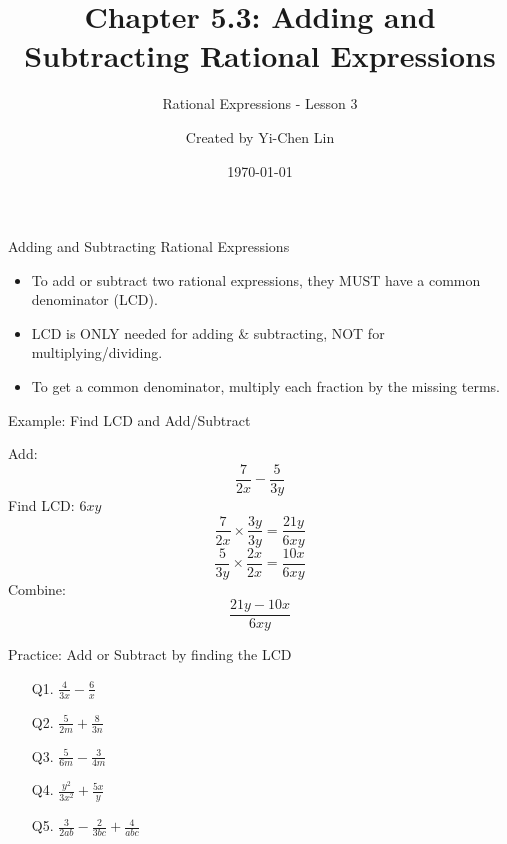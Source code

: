 \documentclass[aspectratio=169]{beamer}
\title{Chapter 5.3: Adding and Subtracting Rational Expressions}
\subtitle{Rational Expressions - Lesson 3}
\author{Created by Yi-Chen Lin}
\date{\today}
\begin{document}
\begin{frame}
\titlepage
\end{frame}

\begin{frame}{Adding and Subtracting Rational Expressions}
\begin{tcolorbox}[colback=lightgray,colframe=primary,title=Key Concepts]
\footnotesize
\begin{itemize}
  \item To add or subtract two rational expressions, they MUST have a common denominator (LCD).
  \item LCD is ONLY needed for adding & subtracting, NOT for multiplying/dividing.
  \item To get a common denominator, multiply each fraction by the missing terms.
\end{itemize}
\end{tcolorbox}
\end{frame}

\begin{frame}{Example: Find LCD and Add/Subtract}
\begin{tcolorbox}[colback=lightgray,colframe=secondary,title=Example 1]
\footnotesize
Add:
\[
\frac{7}{2x} - \frac{5}{3y}
\]
Find LCD: $6xy$
\[
\frac{7}{2x} \times \frac{3y}{3y} = \frac{21y}{6xy}
\]
\[
\frac{5}{3y} \times \frac{2x}{2x} = \frac{10x}{6xy}
\]
Combine:
\[
\frac{21y - 10x}{6xy}
\]
\end{tcolorbox}
\end{frame}

\begin{frame}{Practice: Add or Subtract by finding the LCD}
\begin{tcolorbox}[colback=lightgray,colframe=primary,title=Practice Problems]
\footnotesize
\begin{enumerate}
  \item[Q1.] $\frac{4}{3x} - \frac{6}{x}$
  \item[Q2.] $\frac{5}{2m} + \frac{8}{3n}$
  \item[Q3.] $\frac{5}{6m} - \frac{3}{4m}$
  \item[Q4.] $\frac{y^2}{3x^2} + \frac{5x}{y}$
  \item[Q5.] $\frac{3}{2ab} - \frac{2}{3bc} + \frac{4}{abc}$
\end{enumerate}
\end{tcolorbox}
\end{frame}
\end{document}

